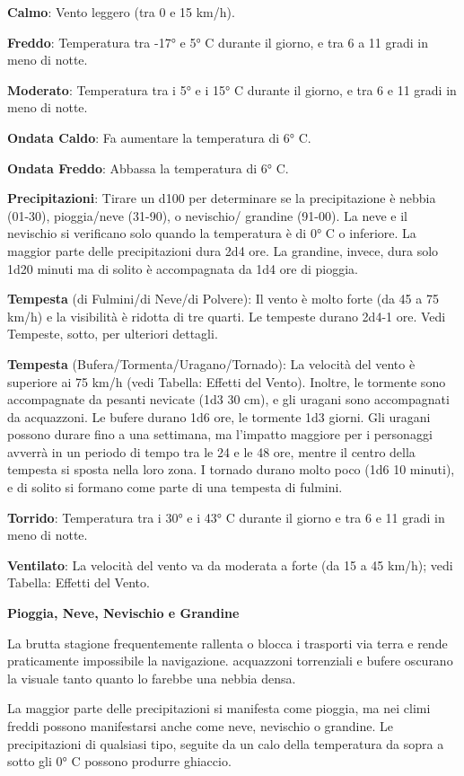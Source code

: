 \documentclass[a4paper,11pt,twoside,openany]{book}
\begin{document}
\textbf{Calmo}: Vento leggero (tra 0 e 15 km/h).

\textbf{Freddo}: Temperatura tra -17° e 5° C durante il giorno, e tra 6 a 11 gradi in meno di notte.

\textbf{Moderato}: Temperatura tra i 5° e i 15° C durante il giorno, e tra 6 e 11 gradi in meno di notte.

\textbf{Ondata Caldo}: Fa aumentare la temperatura di 6° C.

\textbf{Ondata Freddo}: Abbassa la temperatura di 6° C.

\textbf{Precipitazioni}: Tirare un d100 per determinare se la precipitazione è nebbia (01-30), pioggia/neve (31-90), o nevischio/ grandine (91-00). La neve e il nevischio si verificano solo quando la temperatura è di 0° C o inferiore. La maggior parte delle precipitazioni dura 2d4 ore. La grandine, invece, dura solo 1d20 minuti ma di solito è accompagnata da 1d4 ore di pioggia.

\textbf{Tempesta} (di Fulmini/di Neve/di Polvere): Il vento è molto forte (da 45 a 75 km/h) e la visibilità è ridotta di tre quarti. Le tempeste durano 2d4-1 ore. Vedi Tempeste, sotto, per ulteriori dettagli.

\textbf{Tempesta} (Bufera/Tormenta/Uragano/Tornado): La velocità del vento è superiore ai 75 km/h (vedi Tabella: Effetti del Vento). Inoltre, le tormente sono accompagnate da pesanti nevicate (1d3 \texttimes{} 30 cm), e gli uragani sono accompagnati da acquazzoni. Le bufere durano 1d6 ore, le tormente 1d3 giorni. Gli uragani possono durare fino a una settimana, ma l'impatto maggiore per i personaggi avverrà in un periodo di tempo tra le 24 e le 48 ore, mentre il centro della tempesta si sposta nella loro zona. I tornado durano molto poco (1d6 \texttimes{} 10 minuti), e di solito si formano come parte di una tempesta di fulmini.

\textbf{Torrido}: Temperatura tra i 30° e i 43° C durante il giorno e tra 6 e 11 gradi in meno di notte.

\textbf{Ventilato}: La velocità del vento va da moderata a forte (da 15 a 45 km/h); vedi Tabella: Effetti del Vento.

\textbf{Pioggia, Neve, Nevischio e Grandine}

La brutta stagione frequentemente rallenta o blocca i trasporti via terra e rende praticamente impossibile la navigazione. acquazzoni torrenziali e bufere oscurano la visuale tanto quanto lo farebbe una nebbia densa.

La maggior parte delle precipitazioni si manifesta come pioggia, ma nei climi freddi possono manifestarsi anche come neve, nevischio o grandine. Le precipitazioni di qualsiasi tipo, seguite da un calo della temperatura da sopra a sotto gli 0° C possono produrre ghiaccio.
\end{document}
